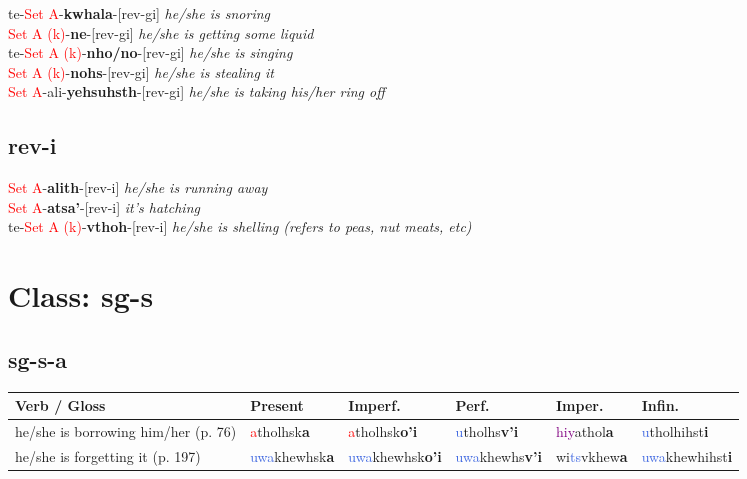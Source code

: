 \documentclass[oneside,openany]{book}%
\begin{document}
te{-}\textcolor{Red}{Set A}{-}\textbf{kwhala}{-}[rev-gi] \textit{ he/she is snoring} \\%
\textcolor{Red}{Set A (k)}{-}\textbf{ne}{-}[rev-gi] \textit{ he/she is getting some liquid} \\%
te{-}\textcolor{Red}{Set A (k)}{-}\textbf{nho/no}{-}[rev-gi] \textit{ he/she is singing} \\%
\textcolor{Red}{Set A (k)}{-}\textbf{nohs}{-}[rev-gi] \textit{ he/she is stealing it} \\%
\textcolor{Red}{Set A}{-}ali{-}\textbf{yehsuhsth}{-}[rev-gi] \textit{ he/she is taking his/her ring off} \\%
\vspace{1em}%
\needspace{1in}%
\subsection*{rev-i}%
\textcolor{Red}{Set A}{-}\textbf{alith}{-}[rev-i] \textit{ he/she is running away} \\%
\textcolor{Red}{Set A}{-}\textbf{atsa'}{-}[rev-i] \textit{ it's hatching} \\%
te{-}\textcolor{Red}{Set A (k)}{-}\textbf{vthoh}{-}[rev-i] \textit{ he/she is shelling (refers to peas, nut meats, etc)} \\%
\vspace{1em}%
\needspace{3in}%
\section*{Class: sg-s}%
%
\needspace{1in}%
\subsection*{sg-s-a}%
\begin{tabularx}{\textwidth}{>{\hsize=1.5\hsize\RaggedRight}X >{\hsize=0.9\hsize}X >{\hsize=0.9\hsize}X >{\hsize=0.9\hsize}X >{\hsize=0.9\hsize}X >{\hsize=0.9\hsize}X}%
\toprule%
\textbf{Verb / Gloss}&\textbf{Present}&\textbf{Imperf.}&\textbf{Perf.}&\textbf{Imper.}&\textbf{Infin.}\\%
\midrule%
he/she is borrowing him/her (p. 76)&\textcolor{Red}{a}tholhsk\textbf{a}&\textcolor{Red}{a}tholhsk\textbf{o'i}&\textcolor{RoyalBlue}{u}tholhs\textbf{v'i}&\textcolor{Purple}{hiy}athol\textbf{a}&\textcolor{RoyalBlue}{u}tholhihst\textbf{i}\\%
he/she is forgetting it (p. 197)&\textcolor{RoyalBlue}{uwa}khewhsk\textbf{a}&\textcolor{RoyalBlue}{uwa}khewhsk\textbf{o'i}&\textcolor{RoyalBlue}{uwa}khewhs\textbf{v'i}&wi\textcolor{RoyalBlue}{ts}vkhew\textbf{a}&\textcolor{RoyalBlue}{uwa}khewhihst\textbf{i}\\%
\bottomrule%
\end{tabularx}%
\vspace{1em}%
\needspace{1in}%
\end{document}
